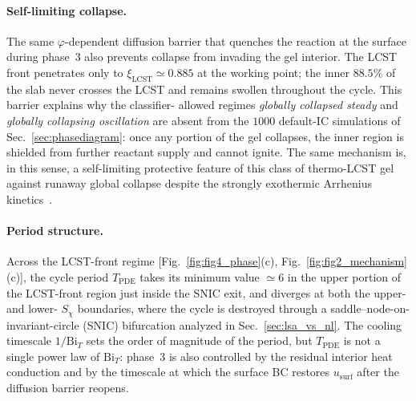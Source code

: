 \documentclass[aps,pre,reprint,superscriptaddress,longbibliography,floatfix]{revtex4-2}
\newcommand{\Bi}{\mathrm{Bi}}
\begin{document}
\paragraph{Self-limiting collapse.}  The same $\varphi$-dependent
diffusion barrier that quenches the reaction at the surface during
phase~3 also prevents collapse from invading the gel interior.  The
LCST front penetrates only to
$\xi_\mathrm{LCST}\!\simeq\!0.885$ at the working point; the inner
$88.5\%$ of the slab never crosses the LCST and remains swollen
throughout the cycle.  This barrier explains why the classifier-
allowed regimes \emph{globally collapsed steady} and \emph{globally
collapsing oscillation} are absent from the $1000$ default-IC
simulations of Sec.~\ref{sec:phasediagram}: once any portion of the
gel collapses, the inner region is shielded from further reactant
supply and cannot ignite.  The same mechanism is, in this sense, a
self-limiting protective feature of this class of thermo-LCST gel
against runaway global collapse despite the strongly exothermic
Arrhenius
kinetics~\cite{FrankKamenetskii1969,Uppal1974}.

\paragraph{Period structure.} Across the LCST-front regime
[Fig.~\ref{fig:fig4_phase}(c), Fig.~\ref{fig:fig2_mechanism}(c)],
the cycle period $T_\mathrm{PDE}$ takes its minimum value
$\simeq\!6$ in the upper portion of the LCST-front region just
inside the SNIC exit, and diverges at both the upper- and lower-
$S_\chi$ boundaries, where the cycle is destroyed through a
saddle--node-on-invariant-circle (SNIC) bifurcation analyzed in
Sec.~\ref{sec:lsa_vs_nl}. The cooling timescale $1/\Bi_T$ sets the
order of magnitude of the period, but $T_\mathrm{PDE}$ is not a
single power law of $\Bi_T$: phase~3 is also controlled by the
residual interior heat conduction and by the timescale at which the
surface BC restores $u_\mathrm{surf}$ after the diffusion barrier
reopens.
\end{document}
